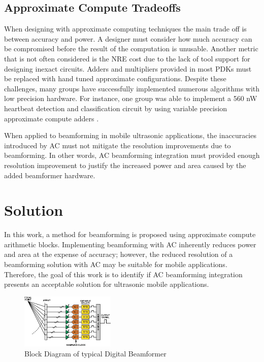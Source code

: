 \documentclass[journal]{IEEEtran}
\begin{document}
\subsection{Approximate Compute Tradeoffs}
When designing with approximate computing techniques the main trade off is between accuracy and power. A designer must consider how much accuracy can be compromised before the result of the computation is unusable. Another metric that is not often considered is the NRE cost due to the lack of tool support for designing inexact circuits. Adders and multipliers provided in most PDKs must be replaced with hand tuned approximate configurations. Despite these challenges, many groups have successfully implemented numerous algorithms with low precision hardware. For instance, one group was able to implement a 560 \si{\nano\watt} heartbeat detection and classification circuit by using variable precision approximate compute adders \cite{amirtharajah2004micropower}.

When applied to beamforming in mobile ultrasonic applications, the inaccuracies introduced by AC must not mitigate the resolution improvements due to beamforming. In other words, AC beamforming integration must provided enough resolution improvement to justify the increased power and area caused by the added beamformer hardware. 

\section{Solution}

In this work, a method for beamforming is proposed using approximate compute arithmetic blocks. Implementing beamforming with AC inherently reduces power and area at the expense of accuracy; however, the reduced resolution of a beamforming solution with AC may be suitable for mobile applications. Therefore, the goal of this work is to identify if AC beamforming integration presents an acceptable solution for ultrasonic mobile applications.

\begin{figure}
    \centering
    \includegraphics[width=0.4\textwidth]{beamform.jpg}
    \caption{Block Diagram of typical Digital Beamformer}
    \label{fig:beamform}
\end{figure}
\end{document}
